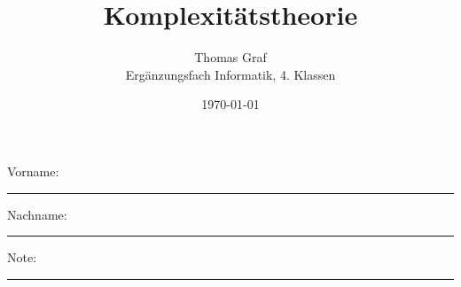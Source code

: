 
\newtoggle{withbonus} \toggletrue{withbonus} %

\newcommand{\mycourse}{Ergänzungsfach Informatik}
\newcommand{\myclass}{4. Klassen}
\newcommand{\mydate}{\today}

\title{\textbf{Komplexitätstheorie}}
\author{Thomas Graf\\
	\mycourse, \myclass}
\date{\mydate}
\maketitle
\thispagestyle{headandfoot}

\begin{center}
\end{center}
\vspace{10mm}

\begin{center}
	Vorname: \rule{45mm}{0.8pt}\qquad Nachname: \rule{45mm}{0.8pt}
\end{center}
\vspace{20mm}

\begin{center}
	\iftoggle{withbonus} {
		\combinedgradetable[h][questions]
	} {
		\gradetable[h][questions]
	}
\end{center}
\vspace{15mm}
\begin{center}
	Note:
	\vspace{10mm}

	\rule{8mm}{1.2pt}
\end{center}
\clearpage


